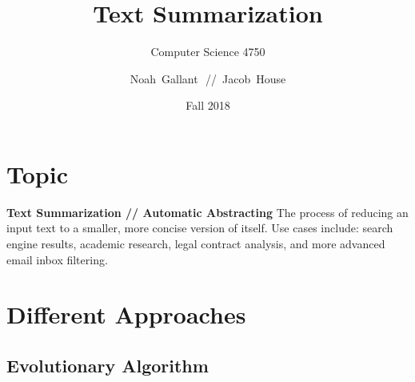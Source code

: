 \documentclass[xcolor={usenames,dvipsnames,svgnames}]{beamer}
\title{Text Summarization}
\subtitle{Computer Science 4750}
\author{Noah~Gallant\,~//~Jacob~House}
\date{Fall 2018}
\begin{document}
\begin{frame}[plain]
\titlepage
\end{frame}

\startheads

\section{Topic}
\begin{frame}

{\large\bfseries Text Summarization // Automatic Abstracting}
\vskip 6pt
The process of reducing an input text to a smaller, more concise version of itself.
\vskip 6pt
Use cases include: search engine results, academic research, legal contract analysis, and more advanced email inbox filtering.
\vfill

\end{frame}

\section{Different Approaches}

\subsection{Evolutionary Algorithm}
\end{document}
